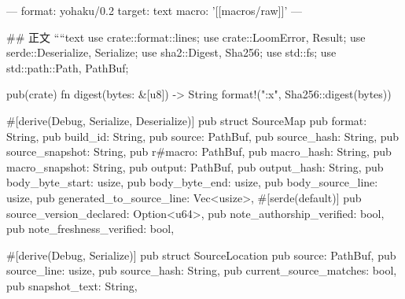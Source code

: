 ---
format: yohaku/0.2
target: text
macro: '[[macros/raw]]'
---

## 正文
````text
use crate::format::lines;
use crate::{LoomError, Result};
use serde::{Deserialize, Serialize};
use sha2::{Digest, Sha256};
use std::fs;
use std::path::{Path, PathBuf};

pub(crate) fn digest(bytes: &[u8]) -> String {
    format!("{:x}", Sha256::digest(bytes))
}

#[derive(Debug, Serialize, Deserialize)]
pub struct SourceMap {
    pub format: String,
    pub build_id: String,
    pub source: PathBuf,
    pub source_hash: String,
    pub source_snapshot: String,
    pub r#macro: PathBuf,
    pub macro_hash: String,
    pub macro_snapshot: String,
    pub output: PathBuf,
    pub output_hash: String,
    pub body_byte_start: usize,
    pub body_byte_end: usize,
    pub body_source_line: usize,
    pub generated_to_source_line: Vec<usize>,
    #[serde(default)]
    pub source_version_declared: Option<u64>,
    pub note_authorship_verified: bool,
    pub note_freshness_verified: bool,
}

#[derive(Debug, Serialize)]
pub struct SourceLocation {
    pub source: PathBuf,
    pub source_line: usize,
    pub source_hash: String,
    pub current_source_matches: bool,
    pub snapshot_text: String,
}

